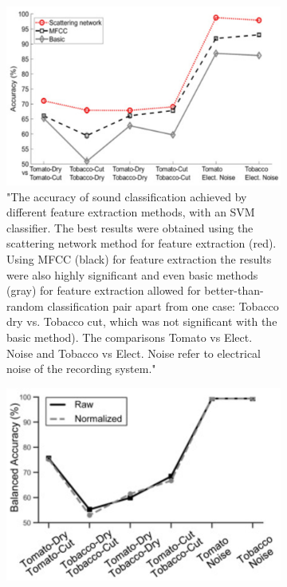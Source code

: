 \noindent %
\begin{figure}[H]
  \centering
  \begin{subfigure}[b]{0.45\textwidth} %
    \includegraphics[width=\textwidth]{images/svm_classifier_results.png} %
    \caption{"The accuracy of sound classification achieved by different feature extraction methods, with an SVM classifier. The best results were obtained using the scattering network method for feature extraction (red). Using MFCC (black) for feature extraction the results were also highly significant and even basic methods (gray) for feature extraction allowed for better-than-random classification pair apart from one case: Tobacco dry vs. Tobacco cut, which was not significant with the basic method). The comparisons Tomato vs Elect. Noise and Tobacco vs Elect. Noise refer to electrical noise of the recording system." \cite{Cell_Sounds_emitted_by_plants}}
    \label{fig:image1}
  \end{subfigure}
  \hfill %
  \begin{subfigure}[b]{0.45\textwidth} %
    \includegraphics[width=\textwidth]{images/cnn_classifier_results.png} %

\end{subfigure}
\end{figure}
